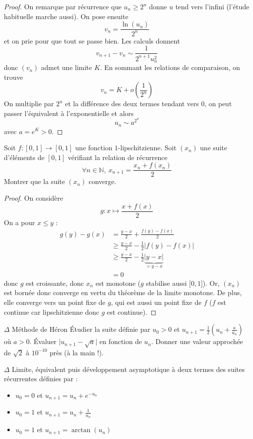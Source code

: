 \documentclass[french,a4paper]{article}
\newcommand{\N}{\mathbb{N}}
\theoremstyle{plain}
\theoremstyle{definition}
\theoremstyle{remark}
\begin{document}
\begin{proof}
	On remarque par récurrence que $u_n\geqslant 2^n$ donne $u$ tend vers l'infini (l'étude habituelle marche aussi). On pose ensuite $$v_n=\frac{\ln(u_n)}{2^n}$$ et on prie pour que tout se passe bien. Les calculs donnent $$v_{n+1}-v_n\sim\frac{1}{2^{n+1}u_n^2}$$ donc $(v_n)$ admet une limite $K$. En sommant les relations de comparaison, on trouve $$v_n=K+o\left(\frac{1}{2^n}\right)$$ On multiplie par $2^n$ et la différence des deux termes tendant vers $0$, on peut passer l'équivalent à l'exponentielle et alors $$u_n\sim a^{2^n}$$ avec $a=e^K>0$.
\end{proof}

\begin{ex}{}
	Soit $f:[0,1]\to[0,1]$ une fonction $1$-lipschitzienne. Soit $(x_n)$ une suite d'éléments de $[0,1]$ vérifiant la relation de récurrence $$\forall n\in\N,\ x_{n+1}=\frac{x_n+f(x_n)}{2}$$ Montrer que la suite $(x_n)$ converge.
\end{ex}

\begin{proof}
	On considère $$g:x\mapsto\frac{x+f(x)}{2}$$ On a pour $x\leqslant y$ : \begin{align*}
		g(y)-g(x)&=\frac{y-x}{2}+\frac{f(y)-f(x)}{2} \\
		&\geqslant \frac{y-x}{2}-\frac{1}{2}\lvert f(y)-f(x)\rvert \\
		&\geqslant\frac{y-x}{2}-\frac{1}{2}\underbrace{\lvert y-x\rvert}_{=y-x}\\
		&=0
	\end{align*} donc $g$ est croissante, donc $x_n$ est monotone ($g$ stabilise aussi $[0,1$]). Or, $(x_n)$ est bornée donc converge en vertu du théorème de la limite monotone. De plus, elle converge vers un point fixe de $g$, qui est aussi un point fixe de $f$ ($f$ est continue car lipschitzienne donc $g$ est continue).
\end{proof}

\begin{ex}{$\Delta$ Méthode de Héron}
	Étudier la suite définie par $u_0>0$ et $u_{n+1}=\displaystyle\frac{1}{2}\left(u_n+\frac{a}{u_n}\right)$ où $a>0$. Évaluer $\lvert u_{n+1}-\sqrt{a}\rvert$ en fonction de $u_n$. Donner une valeur approchée de $\sqrt{2}$ à $10^{-10}$ près (à la main !).
\end{ex}

\begin{ex}{$\Delta$}
	Limite, équivalent puis développement asymptotique à deux termes des suites récurrentes définies par :
	\begin{itemize}
		\item $u_0=0$ et $u_{n+1}=u_n+e^{-u_n}$
		\item $u_0=1$ et $u_{n+1}=u_n+\displaystyle\frac{1}{u_n}$
		\item $u_0=1$ et $u_{n+1}=\arctan(u_n)$
	\end{itemize}
\end{ex}
\end{document}
